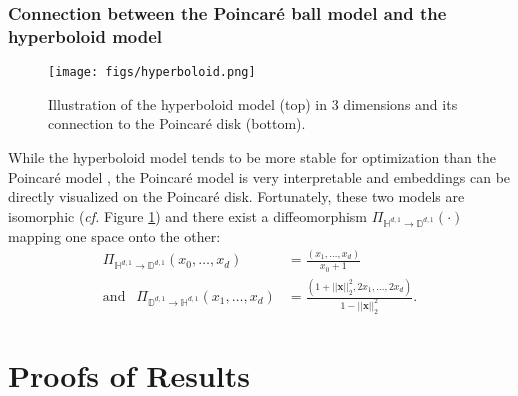 \documentclass{article}
\begin{document}
\subsubsection{Connection between the Poincar\'e ball model and the hyperboloid model}
\begin{figure}[t]
  \begin{center}
    \texttt{[image: figs/hyperboloid.png]}
  \end{center}
  \caption{Illustration of the hyperboloid model (top) in 3 dimensions and its connection to the Poincar\'e disk (bottom).}
  \label{fig:hyperboloid}
\end{figure}
While the hyperboloid model tends to be more stable for optimization than the Poincar\'e model \cite{nickel2018learning}, the Poincar\'e model is very interpretable and embeddings can be directly visualized on the Poincar\'e disk. 
Fortunately, these two models are isomorphic (\emph{cf.} Figure \ref{fig:hyperboloid}) and there exist a diffeomorphism $\Pi_{\mathbb{H}^{d,1}\rightarrow\mathbb{D}^{d,1}}(\cdot)$ mapping one space onto the other:
\begin{align}
    \Pi_{\mathbb{H}^{d,1}\rightarrow\mathbb{D}^{d,1}}(x_0,\ldots,x_d)&=\frac{(x_1,\ldots,x_d)}{x_0+1}\\
    \text{and }\ \  \Pi_{\mathbb{D}^{d,1}\rightarrow\mathbb{H}^{d,1}}(x_1,\ldots,x_d)&=\frac{(1+||\mathbf{x}||_2^2,2x_1,\ldots,2x_d)}{1-||\mathbf{x}||_2^2}.
\end{align}

\section{Proofs of Results}
\end{document}
